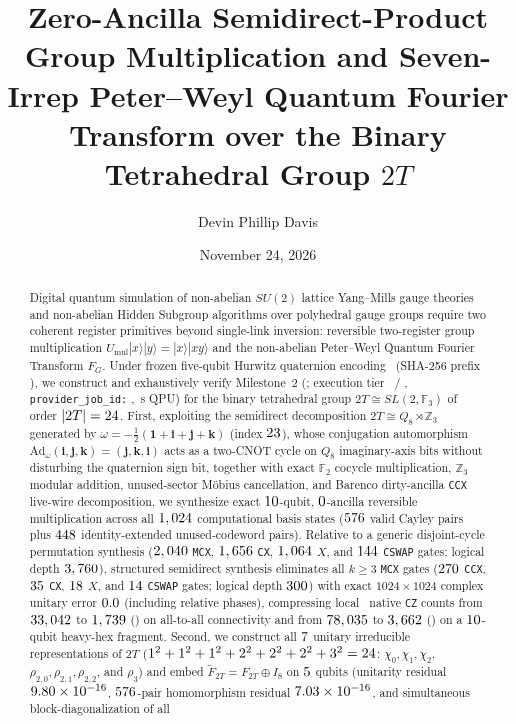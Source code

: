 \documentclass[aps,prx,twocolumn,superscriptaddress,nofootinbib]{revtex4-2}
\begin{document}
\title{Zero-Ancilla Semidirect-Product Group Multiplication and Seven-Irrep Peter--Weyl Quantum Fourier Transform over the Binary Tetrahedral Group $2T$}

\author{Devin Phillip Davis}
\date{November 24, 2026}

\begin{abstract}
Digital quantum simulation of non-abelian $SU(2)$ lattice Yang--Mills gauge theories and non-abelian Hidden Subgroup algorithms over polyhedral gauge groups require two coherent register primitives beyond single-link inversion: reversible two-register group multiplication $U_{\mathrm{mul}}|x\rangle|y\rangle = |x\rangle|xy\rangle$ and the non-abelian Peter--Weyl Quantum Fourier Transform $F_G$. Under frozen five-qubit Hurwitz quaternion encoding \btmEncVer\ (SHA-256 prefix \btmEncSha), we construct and exhaustively verify Milestone~2 (\btmExperimentId; execution tier \btmExecTier\ / \btmCompileTier, \texttt{provider\_job\_id:} \btmJobId, \btmQpuSec\,s QPU) for the binary tetrahedral group $2T \cong SL(2,\mathbb{F}_3)$ of order $|2T| = 24$. First, exploiting the semidirect decomposition $2T \cong Q_8 \rtimes \mathbb{Z}_3$ generated by $\omega = -\tfrac{1}{2}(\mathbf{1} + \mathbf{i} + \mathbf{j} + \mathbf{k})$ (index $23$), whose conjugation automorphism $\mathrm{Ad}_\omega(\mathbf{i},\mathbf{j},\mathbf{k}) = (\mathbf{j},\mathbf{k},\mathbf{i})$ acts as a two-CNOT cycle on $Q_8$ imaginary-axis bits without disturbing the quaternion sign bit, together with exact $\mathbb{F}_2$ cocycle multiplication, $\mathbb{Z}_3$ modular addition, unused-sector M\"obius cancellation, and Barenco dirty-ancilla \texttt{CCX} live-wire decomposition, we synthesize exact $10$-qubit, $0$-ancilla reversible multiplication across all $1,024$ computational basis states ($576$ valid Cayley pairs plus $448$ identity-extended unused-codeword pairs). Relative to a generic disjoint-cycle permutation synthesis ($2,040$ \texttt{MCX}, $1,656$ \texttt{CX}, $1,064$ $X$, and $144$ \texttt{CSWAP} gates; logical depth $3,760$), structured semidirect synthesis eliminates all $k \ge 3$ \texttt{MCX} gates ($270$ \texttt{CCX}, $35$ \texttt{CX}, $18$ $X$, and $14$ \texttt{CSWAP} gates; logical depth $300$) with exact $1024\times 1024$ complex unitary error $0.0$ (including relative phases), compressing local \btmProxyTier\ native \texttt{CZ} counts from $33,042$ to $1,739$ (\btmMulAtaCzRatio) on all-to-all connectivity and from $78,035$ to $3,662$ (\btmMulHhCzRatio) on a $10$-qubit heavy-hex fragment. Second, we construct all $7$ unitary irreducible representations of $2T$ ($1^2 + 1^2 + 1^2 + 2^2 + 2^2 + 2^2 + 3^2 = 24$: $\chi_0,\chi_1,\chi_2$, $\rho_{2,0},\rho_{2,1},\rho_{2,2}$, and $\rho_3$) and embed $\widetilde{F}_{2T} = F_{2T} \oplus I_8$ on $5$ qubits (unitarity residual $9.80 \times 10^{-16}$, $576$-pair homomorphism residual $7.03 \times 10^{-16}$, and simultaneous block-diagonalization of all 
\end{abstract}
\end{document}
